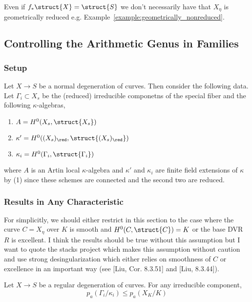 \documentclass[12pt]{article}
\begin{document}
\begin{rmk}
Even if $f_* \struct{X} = \struct{S}$ we don't necessarily have that $X_\eta$ is geometrically reduced e.g. Example~\ref{example:geometrically_nonreduced}.
\end{rmk}


\subsection{Controlling the Arithmetic Genus in Families}

\subsubsection{Setup}

Let $X \to S$ be a normal degeneration of curves. Then consider the following data. Let $\Gamma_i \subset X_s$ be the (reduced) irreducible componetns of the special fiber and the following $\kappa$-algebras,
\begin{enumerate}
\item $A = H^0(X_s, \struct{X_s})$

\item $\kappa' = H^0((X_s)_\red, \struct{(X_s)_\red})$

\item $\kappa_i = H^0(\Gamma_i, \struct{\Gamma_i})$
\end{enumerate}
where $A$ is an Artin local $\kappa$-algebra and $\kappa'$ and $\kappa_i$ are finite field extensions of $\kappa$ by  (1) since these schemes are connected and the second two are reduced.

\subsubsection{Results in Any Characteristic}

For simplicitly, we should either restrict in this section to the case where the curve $C = X_\eta$ over $K$ is smooth and $H^0(C, \struct{C}) = K$ or the base DVR $R$ is excellent. I think the results should be true without this assumption but I want to quote the stacks project which makes this assumption without caution and use strong desingularization which either relies on smoothness of $C$ or excellence in an important way (see [Liu, Cor. 8.3.51] and [Liu, 8.3.44]).

\begin{prop} \label{prop:regular_inequality}
Let $X \to S$ be a regular degeneration of curves. For any irreducible component, 
\[ p_a(\Gamma_i / \kappa_i) \le p_a(X_K/K) \]
\end{prop}
\end{document}
